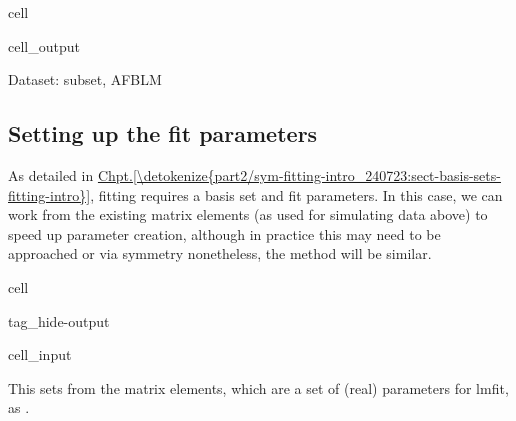 \documentclass[letterpaper,table,10pt,english]{jupyterBook}
\begin{document}
\begin{sphinxuseclass}{cell}
\begin{sphinxVerbatimOutput}
\begin{sphinxuseclass}{cell_output}
\begin{sphinxVerbatim}[commandchars=\\\{\}]
Dataset: subset, AFBLM
\end{sphinxVerbatim}

\noindent{}

\end{sphinxuseclass}\end{sphinxVerbatimOutput}

\end{sphinxuseclass}

\subsection{Setting up the fit parameters}
\label{\detokenize{part2/basic_fitting_numerics_intro_260723:setting-up-the-fit-parameters}}
\sphinxAtStartPar
As detailed in \hyperref[\detokenize{part2/sym-fitting-intro_240723:sect-basis-sets-fitting-intro}]{Chpt.\@ \ref{\detokenize{part2/sym-fitting-intro_240723:sect-basis-sets-fitting-intro}}}, fitting requires a basis set and fit parameters. In this case, we can work from the existing matrix elements (as used for simulating data above) to speed up parameter creation, although in practice this may need to be approached  or via symmetry \sphinxhyphen{} nonetheless, the method will be similar.

\begin{sphinxuseclass}{cell}
\begin{sphinxuseclass}{tag_hide-output}\begin{sphinxVerbatimInput}

\begin{sphinxuseclass}{cell_input}
\begin{sphinxVerbatim}[commandchars=\\\{\}]
\PYG{p}{[}\PYG{p}{]}\PYG{p}{[}\PYG{p}{]}
\end{sphinxVerbatim}

\end{sphinxuseclass}\end{sphinxVerbatimInput}

\end{sphinxuseclass}
\end{sphinxuseclass}
\sphinxAtStartPar
This sets  from the matrix elements, which are a set of (real) parameters for lmfit, as .
\end{document}
